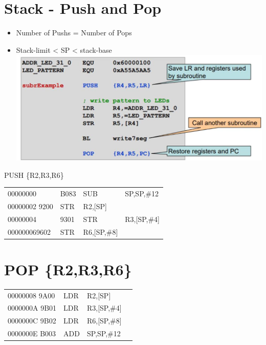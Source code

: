 \section*{Stack - Push and Pop}
\begin{itemize}
  \item Number of Pushs = Number of Pops
  \item Stack-limit < SP < stack-base\\
\includegraphics[width=\linewidth]{images/2024_12_29_79e6b22f503fb7b4f718g-08}
\end{itemize}

PUSH \{R2,R3,R6\}

\begin{center}
\begin{tabular}{llll}
00000000 & B083 & SUB & SP,SP,\#12 \\
00000002 9200 & STR & R2,[SP] &  \\
00000004 & 9301 & STR & R3,[SP,\#4] \\
000000069602 & STR & R6,[SP,\#8] &  \\
\end{tabular}
\end{center}

\section*{POP \{R2,R3,R6\}}
\begin{center}
\begin{tabular}{|llll|}
\hline
00000008 9A00 & LDR & R2,[SP] \\
0000000A 9B01 & LDR & R3,[SP,\#4] \\
0000000C 9B02 & LDR & R6,[SP,\#8] \\
0000000E B003 & ADD & SP,SP,\#12 \\
\hline
\end{tabular}
\end{center}